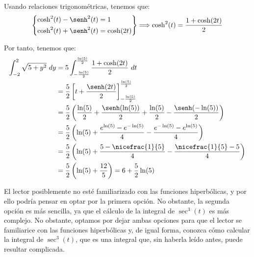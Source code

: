 \begin{ejercicio}
\begin{enumerate}
\begin{description}
            Usando relaciones trigonométricas, tenemos que:
            \begin{equation*}
                \left\{
                    \begin{aligned}
                        \cosh^2(t) - \senh^2(t) &= 1 \\
                        \cosh^2(t) + \senh^2(t) &= \cosh(2t)
                    \end{aligned}
                \right\} \Longrightarrow
                \cosh^2(t) = \frac{1+\cosh(2t)}{2}
            \end{equation*}

            Por tanto, tenemos que:
            \begin{align*}
                \int_{-2}^{2} \sqrt{5 + y^2}~dy
                &= 5\int_{-\frac{\ln(5)}{2}}^{\frac{\ln(5)}{2}} \frac{1+\cosh(2t)}{2}~dt \\
                &= \frac{5}{2}\left[ t + \frac{\senh(2t)}{2} \right]_{-\frac{\ln(5)}{2}}^{\frac{\ln(5)}{2}} \\
                &= \frac{5}{2}\left( \frac{\ln(5)}{2} + \frac{\senh(\ln(5))}{2} + \frac{\ln(5)}{2} - \frac{\senh(-\ln(5))}{2} \right) \\
                &= \frac{5}{2}\left( \ln(5) + \frac{e^{\ln(5)} - e^{-\ln(5)}}{4} - \frac{e^{-\ln(5)} - e^{\ln(5)}}{4} \right) \\
                &= \frac{5}{2}\left( \ln(5) + \frac{5 - \nicefrac{1}{5}}{4} - \frac{\nicefrac{1}{5} - 5}{4} \right) \\
                &= \frac{5}{2}\left( \ln(5) + \frac{12}{5}\right)
                = 6 + \frac{5}{2}\ln(5)
            \end{align*}
        \end{description}

        \begin{observacion}
            El lector posiblemente no esté familiarizado con las funciones hiperbólicas, y por ello
            podría pensar en optar por la primera opción. No obstante, la segunda opción es más sencilla,
            ya que el cálculo de la integral de $\sec^3(t)$ es más complejo. No obstante,
            optamos por dejar ambas opciones para que el lector se familiarice con las funciones hiperbólicas y,
            de igual forma, conozca cómo calcular la integral de $\sec^3(t)$, que es una integral que,
            sin haberla leído antes, puede resultar complicada.
        \end{observacion}
        


\end{enumerate}
\end{ejercicio}
